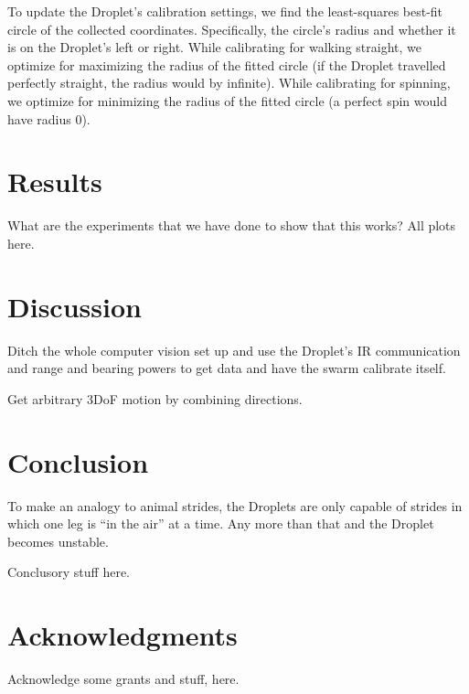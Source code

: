 \documentclass[letterpaper, 10pt, conference]{ieeeconf}
\begin{document}
To update the Droplet's calibration settings, we find the least-squares best-fit circle of the collected coordinates. Specifically, the circle's radius and whether it is on the Droplet's left or right. While calibrating for walking straight, we optimize for maximizing the radius of the fitted circle (if the Droplet travelled perfectly straight, the radius would by infinite). While calibrating for spinning, we optimize for minimizing the radius of the fitted circle (a perfect spin would have radius 0).

\section{Results}
What are the experiments that we have done to show that this works? All plots here.


\section{Discussion}
Ditch the whole computer vision set up and use the Droplet's IR communication and range and bearing powers to get data and have the swarm calibrate itself.

Get arbitrary 3DoF motion by combining directions.

\section{Conclusion}
To make an analogy to animal strides, the Droplets are only capable of strides in which one leg is ``in the air'' at a time. Any more than that and the Droplet becomes unstable.

Conclusory stuff here.

\section*{Acknowledgments}
Acknowledge some grants and stuff, here.



\end{document}
